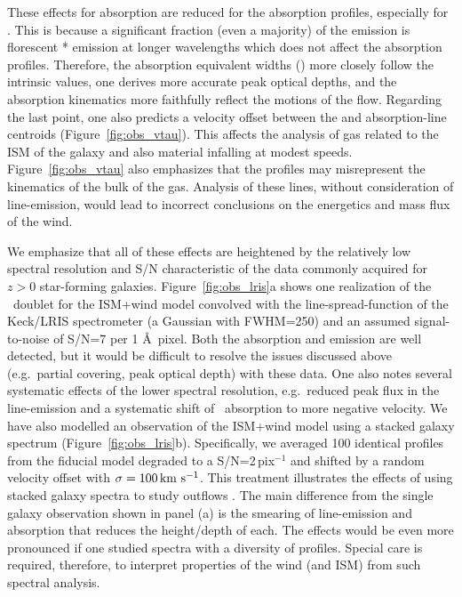 \documentclass[12pt,preprint]{aastex}
\begin{document}
These effects for  absorption are reduced
for the  absorption profiles, especially for \feiia.  This
is because a significant fraction (even a majority) of the
 emission is florescent * emission at longer
wavelengths which does not affect the absorption profiles. 
Therefore, the  absorption equivalent widths (\ewabs) more
closely follow the intrinsic values, one derives more accurate peak
optical depths, and the absorption kinematics more faithfully reflect
the motions of the flow.  Regarding the last point, one also
predicts a velocity offset between the  and 
absorption-line centroids (Figure~\ref{fig:obs_vtau}).
This affects the analysis of gas related to the ISM of the galaxy and
also material infalling at modest speeds.  
Figure~\ref{fig:obs_vtau} also emphasizes that
the  profiles may misrepresent the kinematics of the bulk of
the gas.  Analysis of these lines, without consideration of
line-emission, would lead to incorrect conclusions on the energetics
and mass flux of the wind.

We emphasize that all of these effects are heightened by the
relatively low spectral resolution and S/N characteristic of the data
commonly acquired for $z>0$ star-forming galaxies.  Figure~\ref{fig:obs_lris}a
shows one realization of the \mgiid\ doublet for the ISM+wind model
convolved with the line-spread-function of the Keck/LRIS spectrometer
(a Gaussian with FWHM=250\kms) and an assumed signal-to-noise of
S/N=7 per 1 \AA\ pixel.  Both the absorption
and emission are well detected, but it would be
difficult to resolve the issues discussed above (e.g.\ partial
covering, peak optical depth) with these data.  
One also notes several systematic effects of the lower spectral
resolution, e.g.\ reduced peak flux in the line-emission and a
systematic shift of \mgiia\ absorption to more negative velocity.
We have also modelled an observation of the ISM+wind model using
a stacked galaxy spectrum (Figure~\ref{fig:obs_lris}b).
Specifically, we
averaged 100 identical  profiles from the fiducial model
degraded to a S/N=2\,pix$^{-1}$ and shifted by a random velocity
offset with $\sigma = 100\, {\rm km~s^{-1}}$.  
This treatment illustrates the effects of using stacked galaxy 
spectra to study outflows
\citep[e.g.][S10]{wcp+09,rwk+10}.   The main difference from the
single galaxy observation shown in panel (a) is the smearing of
line-emission and absorption that reduces the height/depth of each.
The effects would be even more pronounced if one studied spectra with
a diversity of  profiles.    
Special care is required, therefore, to interpret properties of the wind (and
ISM) from such spectral analysis.
\end{document}
